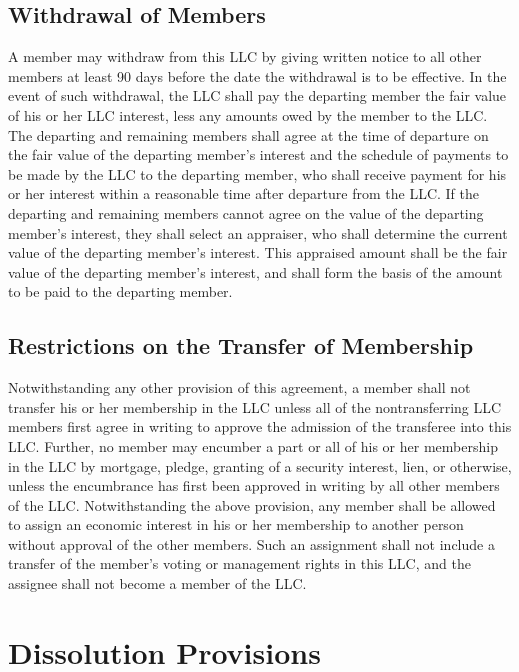 \documentclass{article}
\begin{document}
			\subsection{Withdrawal of Members}
			A member may withdraw from this LLC by giving written notice to all other members at least 90 days before the date the withdrawal is to be effective. In the event of such withdrawal, the LLC shall pay the departing member the fair value of his or her LLC interest, less any amounts owed by the member to the LLC. The departing and remaining members shall agree at the time of departure on the fair value of the departing member's interest and the schedule of payments to be made by the LLC to the departing member, who shall receive payment for his or her interest within a reasonable time after departure from the LLC. If the departing and remaining members cannot agree on the value of the departing member's interest, they shall select an appraiser, who shall determine the current value of the departing member's interest. This appraised amount shall be the fair value of the departing member's interest, and shall form the basis of the amount to be paid to the departing member.

			\subsection{Restrictions on the Transfer of Membership}
			Notwithstanding any other provision of this agreement, a member shall not transfer his or her membership in the LLC unless all of the nontransferring LLC members first agree in writing to approve the admission of the transferee into this LLC. Further, no member may encumber a part or all of his or her membership in the LLC by mortgage, pledge, granting of a security interest, lien, or otherwise, unless the encumbrance has first been approved in writing by all other members of the LLC.
			\indent Notwithstanding the above provision, any member shall be allowed to assign an economic interest in his or her membership to another person without approval of the other members. Such an assignment shall not include a transfer of the member's voting or management rights in this LLC, and the assignee shall not become a member of the LLC.

		\section{Dissolution Provisions}
\end{document}
